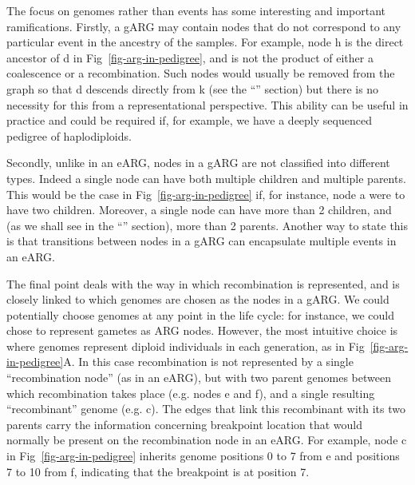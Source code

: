 \documentclass{article}
\begin{document}
The focus on genomes rather than events has some interesting
and important ramifications. Firstly, a gARG may contain nodes that
do not correspond to any particular event in the ancestry of the samples.
For example, node \textsf{h} is the direct ancestor of \textsf{d} in
Fig~\ref{fig-arg-in-pedigree}, and is not the product of either a
coalescence or a recombination. Such nodes would usually be removed
from the graph so that \textsf{d} descends directly from \textsf{k} (see
the ``'' section) but there is no necessity for this from
a representational perspective. This ability can be useful in practice and could be
required if, for example, we have a deeply sequenced pedigree of haplodiploids.

Secondly, unlike in an eARG, nodes in a gARG are not classified into different
types. Indeed a single node can have both multiple children
and multiple parents. This would be the case in Fig~\ref{fig-arg-in-pedigree} if,
for instance, node \textsf{a} were to have two children.
Moreover, a single node can have more than 2 children, and (as we shall see in
the ``'' section), more than 2 parents. Another way to
state this is that transitions between nodes in a gARG can encapsulate multiple
events in an eARG.

The final point deals with the way in which recombination is represented, and is
closely linked to which genomes are chosen as the nodes in a gARG.
We could potentially choose genomes at any point in the life cycle: for instance,
we could chose to represent gametes as ARG nodes. However, the most intuitive
choice is where genomes represent diploid individuals in each generation, as in
Fig~\ref{fig-arg-in-pedigree}A. In this case recombination
is not represented by a single ``recombination node'' (as in an eARG), but with
two parent genomes between which recombination takes place (e.g.
nodes \textsf{e} and \textsf{f}), and a
single resulting ``recombinant'' genome (e.g. \textsf{c}). The
edges that link this recombinant with its two parents carry the information
concerning breakpoint location that would normally be present on the
recombination node in an eARG. For example, node \textsf{c} in
Fig~\ref{fig-arg-in-pedigree} inherits genome positions 0 to 7 from \textsf{e}
and positions 7 to 10 from \textsf{f}, indicating that the breakpoint is at position 7.
\end{document}
